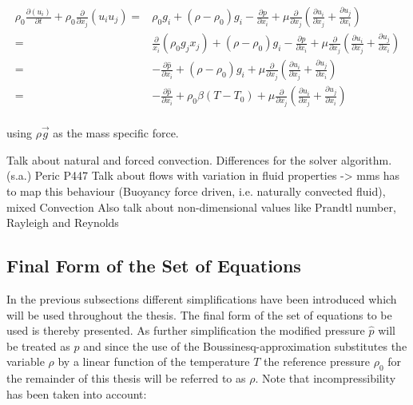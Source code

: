       \begin{align}
        \rho_0 \frac{\partial \left( u_i \right)}{\partial t} 
        + \rho_0 \frac{\partial}{\partial x_j} \left( u_i  u_j \right) 
        =& \rho_0 g_i + \left(\rho - \rho_0 \right) g_i
        - \frac{\partial p}{\partial x_i}
        +  \mu \frac{\partial}{\partial x_j} \left( \frac{\partial u_i}{\partial x_j} 
                                             + \frac{\partial u_j}{\partial x_i} \right) \nonumber \\
        =& \frac{\partial}{x_i}\left(\rho_0 g_j x_j \right) 
        + \left(\rho - \rho_0 \right) g_i
        - \frac{\partial p}{\partial x_i}
        +  \mu \frac{\partial}{\partial x_j} \left( \frac{\partial u_i}{\partial x_j} 
                                             + \frac{\partial u_j}{\partial x_i} \right) \nonumber \\
        =& - \frac{\partial \hat{p}}{\partial x_i} 
        + \left(\rho - \rho_0 \right) g_i
        +  \mu \frac{\partial}{\partial x_j} \left( \frac{\partial u_i}{\partial x_j} 
                                             + \frac{\partial u_j}{\partial x_i} \right) \nonumber \\
        =& - \frac{\partial \hat{p}}{\partial x_i} 
        + \rho_0 \beta \left( T - T_0 \right)
        +  \mu \frac{\partial}{\partial x_j} \left( \frac{\partial u_i}{\partial x_j} 
                                             + \frac{\partial u_j}{\partial x_i} \right) \nonumber \\
      \end{align}

      using \(\rho \vec{g}\) as the mass specific force. 


      Talk about natural and forced convection. Differences for the solver algorithm. (s.a.) Peric P447
      Talk about flows with variation in fluid properties -> mms has to map this behaviour (Buoyancy force driven, i.e. naturally convected fluid), mixed Convection
      Also talk about non-dimensional values like Prandtl number, Rayleigh and Reynolds

    \subsection{Final Form of the Set of Equations}

    In the previous subsections different simplifications have been introduced which will be used throughout the thesis. The final form of the set of equations to be used is thereby presented. As further simplification the modified pressure \(\hat{p}\) will be treated as \(p\) and since the use of the Boussinesq-approximation substitutes the variable \(\rho\) by a linear function of the temperature \(T\) the reference pressure \(\rho_0\) for the remainder of this thesis will be referred to as \(\rho\). Note that incompressibility has been taken into account:

